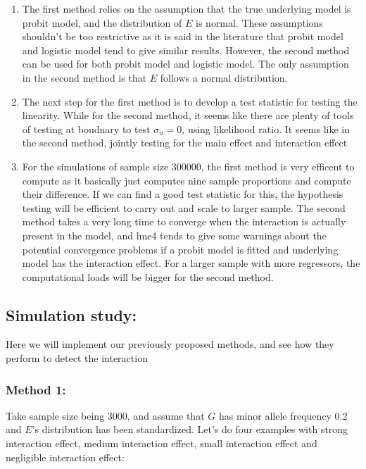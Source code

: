 \documentclass[
]{article}
\begin{document}
\begin{enumerate}
\item The first method relies on the assumption that the true underlying model is probit model, and the distribution of $E$ is normal. These assumptions shouldn't be too restrictive as it is said in the literature that probit model and logistic model tend to give similar results. However, the second method can be used for both probit model and logistic model. The only assumption in the second method is that $E$ follows a normal distribution.
\item The next step for the first method is to develop a test statistic for testing the linearity. While for the second method, it seems like there are plenty of tools of testing at boudnary to test $\sigma_u = 0$, using likelihood ratio. It seems like in the second method, jointly testing for the main effect and interaction effect 
\item For the simulations of sample size 300000, the first method is very efficent to compute as it basically just computes nine sample proportions and compute their difference. If we can find a good test statistic for this, the hypothesis testing will be efficient to carry out and scale to larger sample. The second method takes a very long time to converge when the interaction is actually present in the model, and lme4 tends to give some warnings about the potential convergence problems if a probit model is fitted and underlying model has the interaction effect. For a larger sample with more regressors, the computational loads will be bigger for the second method.

\end{enumerate}

\hypertarget{simulation-study}{%
\subsection{Simulation study:}\label{simulation-study}}

Here we will implement our previously proposed methods, and see how they
perform to detect the interaction

\hypertarget{method-1}{%
\subsubsection{Method 1:}\label{method-1}}

Take sample size being 3000, and assume that \(G\) has minor allele
frequency 0.2 and \(E\)'s distribution has been standardized. Let's do
four examples with strong interaction effect, medium interaction effect,
small interaction effect and negligible interaction effect:
\end{document}
